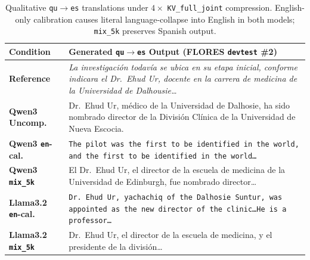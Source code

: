 \documentclass[11pt,a4paper,twocolumn]{article}
\begin{document}
\begin{table}[t]
\centering
\footnotesize
\begin{tabular}{p{1.65cm}p{5.55cm}}
\toprule
Condition & Generated \texttt{qu$\rightarrow$es} Output (FLORES \texttt{devtest} \#2) \\
\midrule
\textbf{Reference} & \textit{La investigaci{\'o}n todav{\'i}a se ubica en su etapa inicial, conforme indicara el Dr.\ Ehud Ur, docente en la carrera de medicina de la Universidad de Dalhousie\dots} \\
\midrule
\textbf{Qwen3 Uncomp.} & Dr.\ Ehud Ur, m{\'e}dico de la Universidad de Dalhosie, ha sido nombrado director de la Divisi{\'o}n Cl{\'i}nica de la Universidad de Nueva Escocia. \\
\textbf{Qwen3 \texttt{en}-cal.} & \textcolor{red!70!black}{\texttt{The pilot was the first to be identified in the world, and the first to be identified in the world\dots}} \\
\textbf{Qwen3 \texttt{mix\_5k}} & El Dr.\ Ehud Ur, el director de la escuela de medicina de la Universidad de Edinburgh, fue nombrado director\dots \\
\midrule
\textbf{Llama3.2 \texttt{en}-cal.} & \textcolor{red!70!black}{\texttt{Dr.\ Ehud Ur, yachachiq of the Dalhosie Suntur, was appointed as the new director of the clinic\dots He is a professor\dots}} \\
\textbf{Llama3.2 \texttt{mix\_5k}} & Dr.\ Ehud Ur, el director de la escuela de medicina, y el presidente de la divisi{\'o}n\dots \\
\bottomrule
\end{tabular}
\caption{Qualitative \texttt{qu}$\rightarrow$\texttt{es} translations under $4\times$ \texttt{KV\_full\_joint} compression. English-only calibration causes literal language-collapse into English in both models; \texttt{mix\_5k} preserves Spanish output.}
\label{tab:qualitative}
\end{table}

\end{document}
